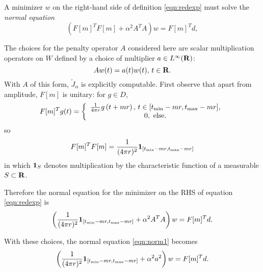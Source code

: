 A minimizer $w$ on the right-hand side of definition
\ref{eqn:redexp} must solve the {\em normal equation}
\begin{equation}
  \label{eqn:norm}
  (F[m]^TF[m]+\alpha^2A^TA)w= F[m]^Td, 
\end{equation}

The choices for the penalty operator $A$ considered here are scalar 
multiplication operators on $W$ defined by a choice of multiplier $a \in L^{\infty}({\bf R})$:
\begin{equation}
  \label{eqn:annmult}
  A w(t)= a(t)w(t), \, t\in {\bf R}.
\end{equation}
With $A$ of this form, $\tilde{J}_{\alpha}$ is explicitly
computable. First observe that apart from amplitude, $F[m]$ is
unitary: for $g \in D$,
\begin{equation}
\label{eqn:tran}
F[m]^T g (t) =
\left\{
  \begin{array}{c}
    \frac{1}{4\pi r}g\left(t+mr\right), \, t \in [t_{\rm min}-mr,
    t_{\rm max}-mr],\\
    0, \mbox{ else.}
  \end{array}
\right.
\end{equation}
so
\begin{equation}
  \label{eqn:unit}
  F[m]^TF[m] = \frac{1}{(4\pi r)^2}{\bf 1}_{[t_{\rm min}-mr,  
    t_{\rm max}-mr]}
\end{equation}
in which ${\bf 1}_{S}$ denotes
multiplication by the characteristic function of a measurable 
$S \subset {\bf R}$.

Therefore the normal equation for the minimizer on the RHS of equation \ref{eqn:redexp} is
\begin{equation}
  \label{eqn:norm1}
  \left(\frac{1}{(4\pi r)^2} {\bf 1}_{[t_{\rm min}-mr,  
      t_{\rm max}-mr]} + \alpha^2 A^TA\right)w= F[m]^Td.
\end{equation}

With these choices, the normal equation \ref{eqn:norm1} becomes
\begin{equation}
\label{eqn:norm2}
\left(\frac{1}{(4\pi r)^2}  {\bf 1}_{[t_{\rm min}-mr,  
      t_{\rm max}-mr]} + \alpha^2a^2\right)w= F[m]^Td.
\end{equation}

